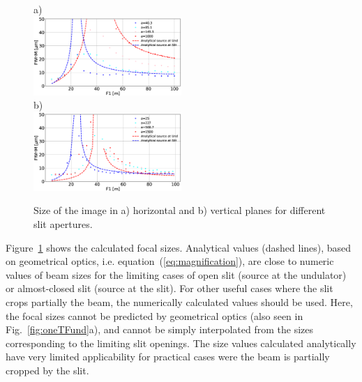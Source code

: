 \documentclass[9pt,twocolumn,twoside]{osajnl}
\begin{document}






\begin{figure}[H]
a)\\
\hspace{-2.0cm}
    \includegraphics[width=0.50\textwidth]{figures/sizes_h.eps}\\
b)\\
\hspace{-2.0cm}
    \includegraphics[width=0.50\textwidth]{figures/sizes_v.eps}

    \caption{
    \label{fig:focalSizes}
    Size of the image in a) horizontal and b) vertical planes for different slit apertures.
    }
\end{figure}



Figure~\ref{fig:focalSizes} shows the calculated focal sizes. Analytical values (dashed lines), based on geometrical optics, i.e. equation~(\ref{eq:magnification}), are close to numeric values of beam sizes for the limiting cases of open slit (source at the undulator) or almost-closed slit (source at the slit). For other useful cases where the slit crops partially the beam, the numerically calculated values should be used. Here, the focal sizes cannot be predicted by geometrical optics (also seen in Fig.~\ref{fig:oneTFund}a), and cannot be simply interpolated from the sizes corresponding to the limiting slit openings. The size values calculated analytically have very limited applicability for practical cases were the beam is partially cropped by the slit. 
\end{document}
